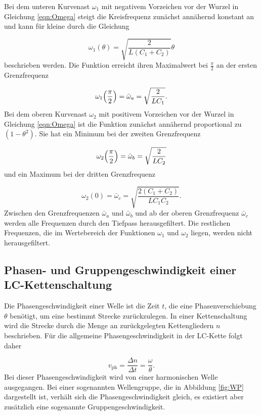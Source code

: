 Bei dem unteren Kurvenast $\omega_1$ mit negativem Vorzeichen vor der Wurzel
in Gleichung \eqref{eqn:Omega}
steigt die Kreisfrequenz zunächst annähernd konstant an und kann für kleine
\theta durch die Gleichung

\begin{equation}
  \omega_1 (\theta) = \sqrt{\frac{2}{L(C_1 + C_2)}} \theta
\end{equation}
beschrieben werden.
Die Funktion erreicht ihren Maximalwert bei $\frac{\pi}{2}$ an
der ersten Grenzfrequenz

\begin{equation}
  \omega_1\Bigl(\frac{\pi}{2}\Bigr) = \bar{\omega}_a = \sqrt{\frac{2}{LC_1}}.
\end{equation}
Bei dem oberen Kurvenast $\omega_2$ mit positivem Vorzeichen vor der Wurzel in
Gleichung \eqref{eqn:Omega} ist die Funktion zunächst annähernd
proportional zu $(1-\theta^2)$.
Sie hat ein Minimum bei der zweiten Grenzfrequenz

\begin{equation}
  \omega_2\Bigl(\frac{\pi}{2}\Bigr) = \bar{\omega}_b = \sqrt{\frac{2}{LC_2}}
\end{equation}
und ein Maximum bei der dritten Grenzfrequenz

\begin{equation}
  \omega_2(0) = \bar{\omega}_c = \sqrt{\frac{2(C_1+C_2)}{LC_1C_2}}.
\end{equation}
Zwischen den Grenzfrequenzen $\bar{\omega}_a$ und $\bar{\omega}_b$ und ab der
oberen Grenzfrequenz $\bar{\omega}_c$ werden alle Frequenzen durch den
Tiefpass herausgefiltert. Die restlichen Frequenzen, die im Wertebereich der
Funktionen $\omega_1$ und $\omega_2$ liegen, werden nicht herausgefiltert.


\subsection{Phasen- und Gruppengeschwindigkeit einer LC-Kettenschaltung}

Die Phasengeschwindigkeit einer Welle ist die Zeit $t$, die eine
Phasenverschiebung $\theta$ benötigt, um eine bestimmt Strecke zurückzulegen.
In einer Kettenschaltung wird die Strecke durch die Menge an zurückgelegten
Kettengliedern $n$ beschrieben.
Für die allgemeine Phasengeschwindigkeit in der LC-Kette folgt daher

\begin{equation}
  v_\text{ph} = \frac{\Delta n}{\Delta t} = \frac{\omega}{\theta}.
  \label{eqn:Phase}
\end{equation}
Bei dieser Phasengeschwindigkeit wird von einer harmonischen Welle ausgegangen.
Bei einer sogenannten Wellengruppe, die in Abbildung \ref{fig:WP} dargestellt
ist, verhält sich die Phasengeschwindigkeit gleich, es existiert aber zusätzlich
eine sogenannte Gruppengeschwindigkeit.

